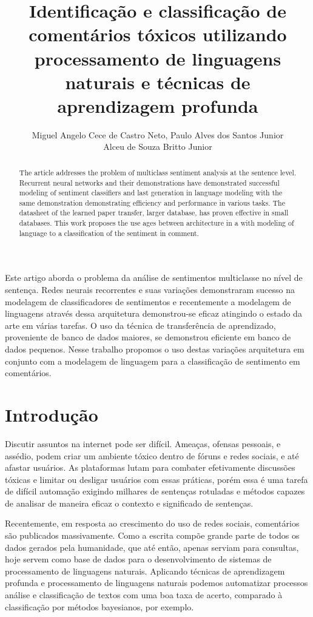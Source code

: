 \documentclass[12pt]{article}
\title{Identificação e classificação de comentários tóxicos utilizando processamento de linguagens naturais e técnicas de aprendizagem profunda}
\author{
    Miguel Angelo Cece de Castro Neto\inst{1},
    Paulo Alves dos Santos Junior\inst{1}\\
    Alceu de Souza Britto Junior\inst{2}
}
\begin{document}
\maketitle

\begin{abstract}
  The article addresses the problem of multiclass sentiment analysis at the sentence level. Recurrent neural networks and their demonstrations have demonstrated successful modeling of sentiment classifiers and last generation in language modeling with the same demonstration demonstrating efficiency and performance in various tasks. The datasheet of the learned paper transfer, larger database, has proven effective in small databases. This work proposes the use ages between architecture in a with modeling of language to a classification of the sentiment in comment.
\end{abstract}

\begin{resumo}
  Este artigo aborda o problema da análise de sentimentos multiclasse no nível de sentença. Redes neurais recorrentes e suas variações demonstraram sucesso na modelagem de classificadores de sentimentos e recentemente a modelagem de linguagens através dessa arquitetura demonstrou-se eficaz atingindo o estado da arte em várias tarefas. O uso da técnica de transferência de aprendizado, proveniente de banco de dados maiores, se demonstrou eficiente em banco de dados pequenos. Nesse trabalho propomos o uso destas variações arquitetura em conjunto com a modelagem de linguagem para a classificação de sentimento em comentários.
\end{resumo}


\section{Introdução} \label{sec:introducao}

Discutir assuntos na internet pode ser difícil. Ameaças, ofensas pessoais, e assédio, podem criar um ambiente tóxico dentro de fóruns e redes sociais, e até afastar usuários. As plataformas lutam para combater efetivamente discussões tóxicas e limitar ou desligar usuários com essas práticas, porém essa é uma tarefa de difícil automação exigindo milhares de sentenças rotuladas e métodos capazes de analisar de maneira eficaz o contexto e significado de sentenças.

Recentemente, em resposta ao crescimento do uso de redes sociais, comentários são publicados massivamente. Como a escrita compõe grande parte de todos os dados gerados pela humanidade, que até então, apenas serviam para consultas, hoje servem como base de dados para o desenvolvimento de sistemas de processamento de linguagens naturais. Aplicando técnicas de aprendizagem profunda e processamento de linguagens naturais podemos automatizar processos análise e classificação de textos com uma boa taxa de acerto, comparado à classificação por métodos bayesianos, por exemplo.
\end{document}
